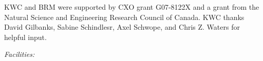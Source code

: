 \documentclass{emulateapj}
\begin{document}
\acknowledgements

KWC and BRM were supported by CXO grant G07-8122X and a grant from the
Natural Science and Engineering Research Council of Canada. KWC thanks
David Gilbanks, Sabine Schindlesr, Axel Schwope, and Chris Z. Waters
for helpful input.


{\it Facilities:}  
 





\clearpage





\end{document}
